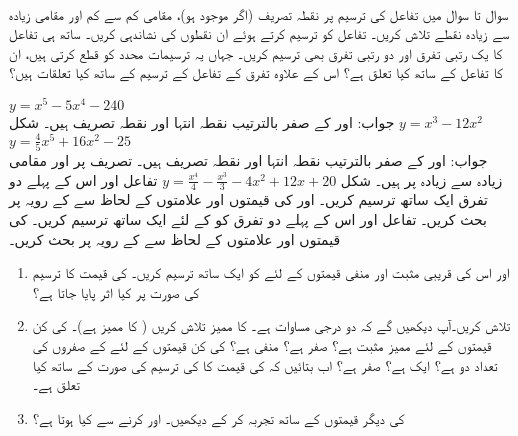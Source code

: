 \\
سوال  تا سوال  میں تفاعل کی ترسیم پر نقطہ تصریف (اگر موجود ہو)، مقامی کم سے کم اور مقامی زیادہ سے زیادہ نقطے  تلاش کریں۔ تفاعل کو ترسیم کرتے ہوئے ان نقطوں کی نشاندہی کریں۔ ساتھ ہی تفاعل کا یک رتبی تفرق اور دو رتبی تفرق بھی ترسیم کریں۔ جہاں یہ ترسیمات  محدد کو قطع کرتی ہیں، ان کا تفاعل کے ساتھ کیا تعلق ہے؟ اس کے علاوہ تفرق کے تفاعل کے ترسیم کے ساتھ کیا تعلقات ہیں؟ 

$y=x^5-5x^4-240$\\
جواب:\quad
{} اور  کے صفر بالترتیب نقطہ انتہا اور نقطہ تصریف ہیں۔ شکل 
$y=x^3-12x^2$
$y=\tfrac{4}{5}x^5+16x^2-25$\\
جواب:\quad
{} اور  کے صفر بالترتیب نقطہ انتہا اور نقطہ تصریف ہیں۔ تصریف  پر اور مقامی زیادہ سے زیادہ  پر ہیں۔ شکل 
$y=\tfrac{x^4}{4}-\tfrac{x^3}{3}-4x^2+12x+20$
تفاعل  اور اس کے پہلے دو تفرق ایک ساتھ ترسیم کریں۔  اور  کی قیمتوں اور علامتوں کے لحاظ سے  کے رویہ پر بحث کریں۔
تفاعل  اور اس کے پہلے دو تفرق کو  کے لئے ایک ساتھ ترسیم کریں۔  کی قیمتوں اور علامتوں کے لحاظ سے  کے رویہ پر بحث کریں۔
\begin{enumerate}
\item
{} اور  اس کی قریبی مثبت اور منفی قیمتوں کے لئے  کو ایک ساتھ ترسیم کریں۔ کی قیمت کا ترسیم کی صورت پر کیا اثر پایا جاتا ہے؟
\item
{} تلاش کریں۔آپ دیکھیں گے کہ  دو درجی مساوات ہے۔  کا ممیز تلاش کریں ( کا ممیز  ہے)۔  کی کن قیمتوں کے لئے ممیز مثبت ہے؟ صفر ہے؟ منفی ہے؟  کی کن قیمتوں کے لئے  کے  صفروں کی تعداد دو ہے؟ ایک ہے؟  صفر ہے؟ اب بتائیں کہ  کی قیمت کا  کی ترسیم کی صورت کے ساتھ کیا تعلق ہے۔
\item
{} کی دیگر قیمتوں کے ساتھ تجربہ کر کے دیکھیں۔  اور  کرنے سے کیا ہوتا ہے؟
\end{enumerate}

